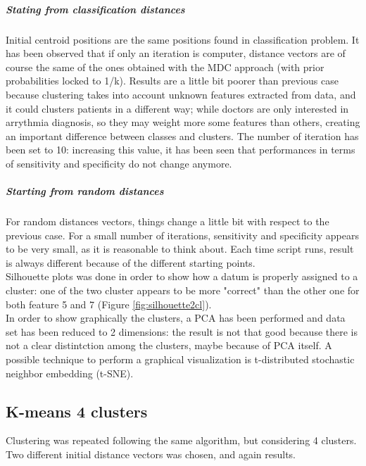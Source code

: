 \documentclass{article}
\begin{document}
\subparagraph{Stating from classification distances}
Initial centroid positions are the same positions found in classification problem. It has been observed that if only an iteration is computer, distance vectors are of course the same of the ones obtained with the MDC approach (with prior probabilities locked to 1/k). Results are a little bit poorer than previous case because clustering takes into account unknown features extracted from data, and it could clusters patients in a different way; while doctors are only interested in arrythmia diagnosis, so they may weight more some features than others, creating an important difference between classes and clusters.
The number of iteration has been set to 10: increasing this value, it has been seen that performances in terms of sensitivity and specificity do not change anymore. 

\subparagraph{Starting from random distances}
For random distances vectors, things change a little bit with respect to the previous case. For a small number of iterations, sensitivity and specificity appears to be very small, as it is reasonable to think about. Each time script runs, result is always different because of the different starting points.\\

Silhouette plots was done in order to show how a datum is properly assigned to a cluster: one of the two cluster appears to be more "correct" than the other one for both feature 5 and 7 (Figure \ref{fig:silhouette2cl}).\\

In order to show graphically the clusters, a PCA has been performed and data set has been reduced to 2 dimensions: the result is not that good because there is not a clear distintction among the clusters, maybe because of PCA itself. A possible technique to perform a graphical visualization is t-distributed stochastic neighbor embedding (t-SNE). 

\subsection{K-means 4 clusters}
Clustering was repeated following the same algorithm, but considering 4 clusters. Two different initial distance vectors was chosen, and again results. 
 
\label{lst: Arrythmia analysis - Main}
\label{lst: 2 classes probabilities}
\end{document}
